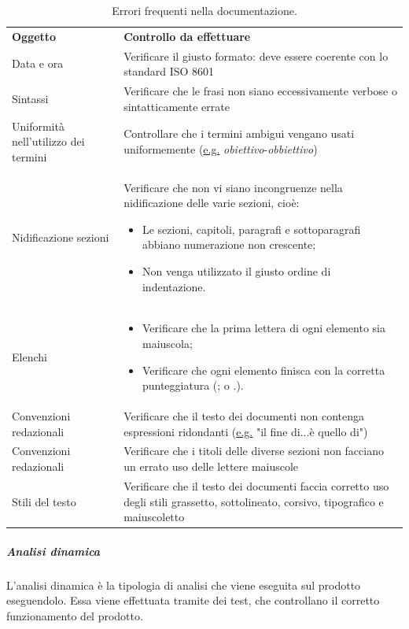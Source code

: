 \documentclass[../norme-di-progetto.tex]{subfiles}
\begin{document}
\begin{table}[H]
\centering
\begin{tabular}{p{5cm}p{10cm}}
\textbf{Oggetto}           & \textbf{Controllo da effettuare}      \\
Data e ora                              & Verificare il giusto formato: deve essere coerente con lo standard ISO 8601 \\
Sintassi                          & Verificare che le frasi non siano eccessivamente verbose o sintatticamente errate       \\
Uniformità nell'utilizzo dei termini & Controllare che i termini ambigui vengano usati uniformemente (\underline{e.g.} \textit{obiettivo}-\textit{obbiettivo}) \\
Nidificazione sezioni            & Verificare che non vi siano incongruenze nella nidificazione delle varie sezioni, cioè: \begin{itemize}
  \item Le sezioni, capitoli, paragrafi e sottoparagrafi abbiano numerazione non crescente;
  \item Non venga utilizzato il giusto ordine di indentazione.
\end{itemize}       \\
Elenchi                           & \begin{itemize}
  \item Verificare che la prima lettera di ogni elemento sia maiuscola;
  \item Verificare che ogni elemento finisca con la corretta punteggiatura (; o .).
\end{itemize}       \\
Convenzioni redazionali   & Verificare che il testo dei documenti non contenga espressioni ridondanti (\underline{e.g.} "il fine di...è quello di") \\
Convenzioni redazionali   & Verificare che i titoli delle diverse sezioni non facciano un errato uso delle lettere maiuscole \\
Stili del testo     & Verificare che il testo dei documenti faccia corretto uso degli stili grassetto, sottolineato, corsivo, tipografico e maiuscoletto \\
\end{tabular}
\caption{Errori frequenti nella documentazione.}
\end{table}

\subparagraph{Analisi dinamica}
L'analisi dinamica è la tipologia di analisi che viene eseguita sul prodotto eseguendolo. Essa viene effettuata tramite dei test, che controllano il corretto funzionamento del prodotto.
\end{document}
